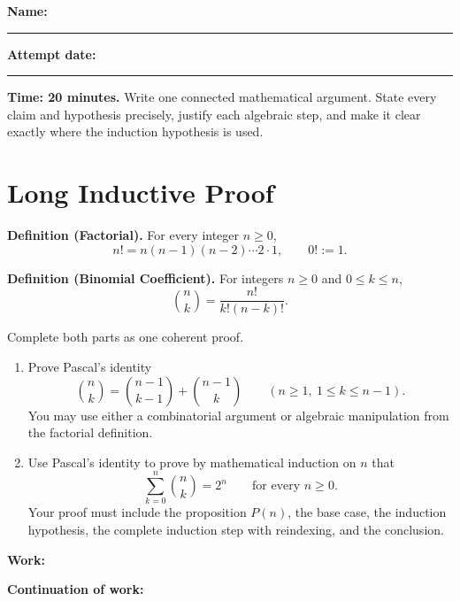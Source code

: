 \documentclass[11pt]{article}
\begin{document}
\textbf{Name:} \rule{3.2in}{0.4pt}\hfill
\textbf{Attempt date:} \rule{1.55in}{0.4pt}

\textbf{Time: 20 minutes.} Write one connected mathematical argument. State
every claim and hypothesis precisely, justify each algebraic step, and make it
clear exactly where the induction hypothesis is used.

\section*{Long Inductive Proof}

\textbf{Definition (Factorial).}
For every integer $n\ge 0$,
\[
  n!=n(n-1)(n-2)\cdots 2\cdot 1,
  \qquad 0!:=1.
\]

\textbf{Definition (Binomial Coefficient).}
For integers $n\ge 0$ and $0\le k\le n$,
\[
  \binom{n}{k}=\frac{n!}{k!(n-k)!}.
\]

Complete both parts as one coherent proof.

\begin{enumerate}[label=\textbf{(\alph*)}]
  \item Prove Pascal's identity
  \[
    \binom{n}{k}=\binom{n-1}{k-1}+\binom{n-1}{k}
    \qquad (n\ge 1,\ 1\le k\le n-1).
  \]
  You may use either a combinatorial argument or algebraic manipulation from
  the factorial definition.

  \item Use Pascal's identity to prove by mathematical induction on $n$ that
  \[
    \sum_{k=0}^{n}\binom{n}{k}=2^n
    \qquad\text{for every }n\ge 0.
  \]
  Your proof must include the proposition $P(n)$, the base case, the induction
  hypothesis, the complete induction step with reindexing, and the conclusion.
\end{enumerate}

\vfill
\textbf{Work:}
\vfill
\vfill
\vfill

\newpage
\textbf{Continuation of work:}
\vfill
\vfill
\vfill
\vfill
\end{document}

